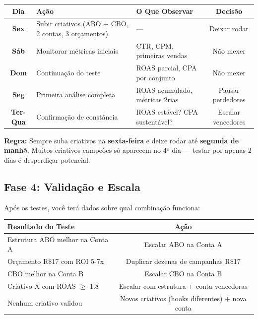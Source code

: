 \documentclass[12pt, a4paper]{article}
\begin{document}
\begin{table}[H]
    \centering
    \small
    \renewcommand{\arraystretch}{1.3}
    \begin{tabularx}{\textwidth}{c X X c}
        \toprule
        \rowcolor{tableHeader} \textbf{Dia} & \textbf{Ação} & \textbf{O Que Observar} & \textbf{Decisão} \\
        \midrule
        \textbf{Sex} & Subir criativos (ABO + CBO, 2 contas, 3 orçamentos) & --- & Deixar rodar \\
        \rowcolor{lightGray}
        \textbf{Sáb} & Monitorar métricas iniciais & CTR, CPM, primeiras vendas & Não mexer \\
        \textbf{Dom} & Continuação do teste & ROAS parcial, CPA por conjunto & Não mexer \\
        \rowcolor{lightGray}
        \textbf{Seg} & Primeira análise completa & ROAS acumulado, métricas 2rias & Pausar perdedores \\
        \textbf{Ter-Qua} & Confirmação de constância & ROAS estável? CPA sustentável? & Escalar vencedores \\
        \bottomrule
    \end{tabularx}
\end{table}

\textcolor{accentColor}{\textbf{Regra:}} Sempre suba criativos na \textbf{sexta-feira} e deixe rodar até \textbf{segunda de manhã}. Muitos criativos campeões só aparecem no 4º dia --- testar por apenas 2 dias é desperdiçar potencial.

\needspace{8cm}

\subsection{Fase 4: Validação e Escala}

Após os testes, você terá dados sobre qual combinação funciona:

\begin{table}[H]
    \centering
    \renewcommand{\arraystretch}{1.4}
    \begin{tabularx}{\textwidth}{X c}
        \toprule
        \rowcolor{tableHeader} \textbf{Resultado do Teste} & \textbf{Ação} \\
        \midrule
        Estrutura ABO melhor na Conta A & Escalar ABO na Conta A \\
        \rowcolor{lightGray}
        Orçamento R\$17 com ROI 5-7x & Duplicar dezenas de campanhas R\$17 \\
        CBO melhor na Conta B & Escalar CBO na Conta B \\
        \rowcolor{lightGray}
        Criativo X com ROAS $\geq$ 1.8 & Escalar com estrutura + conta vencedoras \\
        Nenhum criativo validou & Novos criativos (hooks diferentes) + nova conta \\
        \bottomrule
    \end{tabularx}
\end{table}
\end{document}
